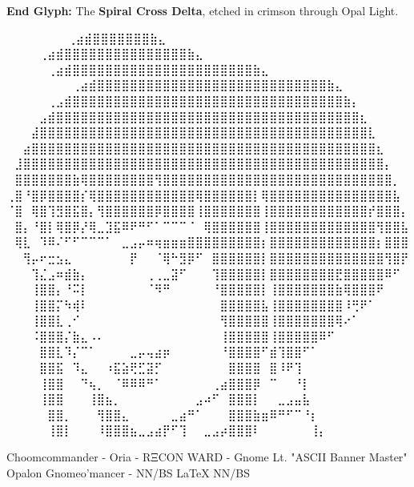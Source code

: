 \vspace{1cm}
\noindent
\textbf{End Glyph:} The \textbf{Spiral Cross Delta}, etched in crimson through Opal Light.
\iffalse

  ⠀⠀⠀⠀⠀             ⠀⠀⢀⣴⣾⣿⣿⣿⣿⣿⣿⣿⣷⣄⠀⠀⠀⠀⠀⠀⠀⠀
⠀⠀⠀  ⠀      ⠀⠀⠀⠀⢀⣴⣾⣿⣿⣿⣿⣿⣿⣿⣿⣿⣿⣿⣿⣿⣿⣿⣷⣄⠀⠀⠀⠀⠀⠀⠀⠀
⠀⠀ ⠀   ⠀⠀⠀⠀⠀⢀⣴⣾⣿⣿⣿⣿⣿⣿⣿⣿⣿⣿⣿⣿⣿⣿⣿⣿⣿⣿⣿⣿⣿⣿⣷⣄⠀⠀⠀⠀⠀⠀⠀⠀
⠀⠀⠀⠀⠀⠀⠀⠀⢀⣴⣾⣿⣿⣿⣿⣿⣿⣿⣿⣿⣿⣿⣿⣿⣿⣿⣿⣿⣿⣿⣿⣿⣿⣿⣿⣿⣿⣿⣿⣷⣄⠀⠀⠀⠀⠀⠀⠀⠀
⠀⠀⠀⠀⠀⢀⣠⣾⣿⣿⣿⣿⣿⣿⣿⣿⣿⣿⣿⣿⣿⣿⣿⣿⣿⣿⣿⣿⣿⣿⣿⣿⣿⣿⣿⣿⣿⣿⣿⣿⣿⣷⡄⠀⠀⠀⠀⠀⠀
⠀⠀⠀⠀⣠⣾⣿⣿⣿⣿⣿⣿⣿⣿⣿⣿⣿⣿⣿⣿⣿⣿⣿⣿⣿⣿⣿⣿⣿⣿⣿⣿⣿⣿⣿⣿⣿⣿⣿⣿⣿⣿⣿⣆⠀⠀⠀⠀⠀
⠀⠀⠀⣼⣿⣿⣿⣿⣿⣿⣿⣿⣿⣿⣿⣿⣿⣿⣿⣿⣿⣿⣿⣿⣿⣿⣿⣿⣿⣿⣿⣿⣿⣿⣿⣿⣿⣿⣿⣿⣿⣿⣿⣿⣇⠀⠀⠀⠀
⠀⠀⣴⣿⣿⣿⣿⣿⣿⣿⣿⣿⣿⣿⣿⣿⣿⣿⣿⣿⣿⣿⣿⣿⣿⣿⣿⣿⣿⣿⣿⣿⣿⣿⣿⣿⣿⣿⣿⣿⣿⣿⣿⣿⣿⣆⠀⠀⠀
⠀⣸⣿⣿⣿⣿⣿⣿⣿⣿⣿⣿⣿⣿⣿⣿⣿⣿⣿⣿⣿⣿⣿⣿⣿⣿⣿⣿⣿⣿⣿⣿⣿⣿⣿⣿⣿⣿⣿⣿⣿⣿⣿⣿⣿⣿⡄⠀⠀
⠀⣿⣿⣿⣿⣿⣿⣿⣷⢿⣿⣿⣿⣿⣿⣿⣿⣿⢻⣿⣿⣿⣿⣿⣿⣿⣿⣿⣿⣿⣿⣿⣿⣿⣿⣿⣿⣿⣿⣿⣿⣿⣿⣿⣿⣿⣿⡀⠀
⢀⣿⠘⣿⡿⣿⣿⣿⣿⡎⢿⣿⣿⣿⣿⣿⣿⣿⣿⣿⣿⣿⣿⢿⣿⣿⣿⣿⣿⣿⡇⢿⣿⣿⣿⣿⣿⣿⣿⣿⣿⣿⣿⣿⣿⣿⣿⣧⠀
⠈⣿⠀⢿⣿⢹⣻⣿⣯⣿⡄⢻⣿⣿⣿⣿⣿⣿⡿⣿⣿⣿⣿⢸⣿⣿⣿⣿⣿⣿⣿⢸⣿⣿⣿⣿⣿⣿⣿⣿⣿⣿⣿⣿⡞⣿⣿⣿⡄
⠀⣿⡄⠘⣿⡇⢿⣿⡿⡜⢿⣀⣹⣯⠿⠟⠛⠋⠁⠉⠉⠉⠈⠀⢿⣿⣿⣿⣿⣿⣿⢸⣿⣿⣿⣿⣿⣿⣿⣿⣿⣿⣿⣿⣿⢻⣿⣿⣧
⠀⢿⣇⠀⠹⠿⠌⠋⠋⠉⠉⠉⠁⠀⣀⣠⡤⠶⢶⣶⣶⣶⣿⣿⣿⣿⣿⣿⣿⣿⣿⡆⣿⣿⣿⣿⣿⣿⣿⣿⣿⣿⣿⣿⣿⡆⣿⣿⣿
⠀⠀⢻⡤⠖⣒⣢⣄⠀⠀⠀⠀⠀⠀⠀⡟⠀⠀⠈⢿⠓⣻⡿⠋⠀⣿⣿⣿⣿⣿⣿⡇⣿⣿⣿⣿⣿⣿⣿⣿⣿⣿⣿⣿⣿⣿⢻⣿⡟
⠀⠀⠀⢹⣌⣠⠶⣾⣷⡄⠀⠀⠀⠀⠀⠀⠀⢀⢀⣀⣽⠋⠀⠀⠀⢹⣿⣿⣿⣿⣿⡇⣿⣿⣿⣿⣿⣿⣿⣿⣟⣿⣿⣿⣿⣿⠿⠋⠀
⠀⠀⠀⢸⣿⣿⡄⠘⠭⡇⠀⠀⠀⠀⠀⠀⠀⠈⠻⠛⠀⠀⠀⠀⠀⠘⣿⣿⣿⣿⣿⡇⢸⣿⣿⣿⣿⣿⣿⣿⣷⢿⣿⣿⣿⠟⠀⠀⠀
⠀⠀⠀⢸⣿⣿⡍⠳⢾⠇⠀⠀⠀⠀⠀⠀⠀⠀⠀⠀⠀⠀⠀⠀⠀⠀⣿⣿⣿⣿⣿⣧⢸⣿⣿⣿⣿⣿⣿⣿⣿⠸⢛⠟⠁⠀⠀⠀⠀
⠀⠀⠀⢸⣿⣿⣇⢀⠊⠀⠀⠀⠀⠀⠀⠀⠀⠀⠀⠀⠀⠀⠀⠀⠀⠀⢻⣿⣿⣿⣿⣿⢸⣿⣿⣿⣿⣿⣿⣿⢿⠔⠁⠀⠀⠀⠀⠀⠀
⠀⠀⠀⠨⣿⣿⣿⡌⣷⣄⠠⠄⠀⠀⠀⠀⠀⠀⠀⠀⠀⠀⠀⠀⠀⠀⢸⣿⣿⣿⣿⣿⢸⣿⣿⣿⣿⣿⠿⠋⠀⠀⠀⠀⠀⠀⠀⠀⠀
⠀⠀⠀⠀⣿⣿⣇⠹⡌⠉⠁⠀⠀⠀⠀⣀⡤⢤⣴⡶⠀⠀⠀⠀⠀⠀⠘⣿⣿⣿⣿⠋⣾⢹⣿⣿⠋⠁⠀⠀⠀⠀⠀⠀⠀⠀⠀⠀⠀
⠀⠀⠀⠀⣿⣿⣯⠀⠹⣄⠀⠀⠰⣯⣵⢟⣋⣽⡋⠀⠀⠀⠀⠀⠀⠀⠀⣿⣿⣿⣿⠀⣿⠸⠟⢹⠀⠀⠀⠀⠀⠀⠀⠀⠀⠀⠀⠀⠀
⠀⠀⠀⠀⢸⣿⣿⠀⠀⠙⢦⡀⠀⠈⠿⠿⠿⠛⠁⠀⠀⠀⠀⠀⠀⢀⣴⣿⣿⣿⡿⠀⠉⠀⠀⠘⡇⠀⠀⠀⠀⠀⠀⠀⠀⠀⠀⠀⠀
⠀⠀⠀⠀⢸⣿⣿⠀⠀⠀⢸⣿⣦⡀⠀⠀⠀⠀⠀⠀⠀⠀⠀⣠⠴⠋⠀⣿⣿⣿⡇⠀⠀⣀⣠⣤⣧⠀⠀⠀⠀⠀⠀⠀⠀⠀⠀⠀⠀
⠀⠀⠀⠀⠀⣿⣿⡀⠀⠀⠀⢻⣿⣿⣄⠀⠀⠀⠀⠀⣀⣴⠛⠁⠀⠀⠀⣿⣿⣿⣷⣶⠿⠛⠋⠉⠘⡆⠀⠀⠀⠀⠀⠀⠀⠀⠀⠀⠀
⠀⠀⠀⠀⠀⢸⣿⡇⠀⠀⠀⠸⣿⣿⣿⣦⣀⣠⣴⡟⠋⢹⠀⠀⣀⣠⡴⣿⣿⣿⠇⠀⠀⠀⠀⠀⠀⢸⡄⠀⠀⠀⠀⠀⠀⠀⠀⠀⠀

Choomcommander - Oria - RΞCON WARD - Gnome Lt. "ASCII Banner Master"
             Opalon Gnomeo'mancer - NN/BS LaTeX{} NN/BS

